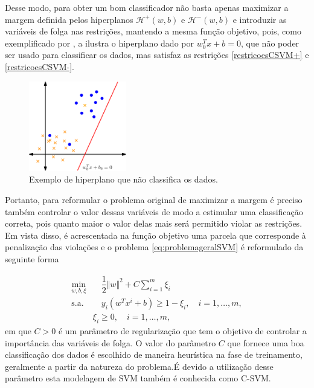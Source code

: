 \documentclass[12pt,a4paper]{scrartcl}
\def\Hset{\mathcal{H}}
\theoremstyle{definition}%
\begin{document}
Desse modo, para obter um bom classificador não basta apenas maximizar a margem definida pelos hiperplanos $\Hset^{+} (w,b)$ e $\Hset^{-} (w,b)$ e introduzir as variáveis de folga nas restrições, mantendo a mesma função objetivo, pois, como exemplificado por \textcite{Evelin2017}, a  ilustra o hiperplano dado por $w_{0}^{T}x+b = 0$, que não poder ser usado para classificar os dados, mas satisfaz as restrições \eqref{restricoesCSVM+} e \eqref{restricoesCSVM-}. 

\begin{figure}[!ht] 
	\centering
	\includegraphics[width=0.38\textwidth]{hiperplano_nao_classifica_dados}
	\caption{Exemplo de hiperplano que não classifica os dados. \label{fig:hiperplano_nao_classificador}}
\end{figure}
 

Portanto, para reformular o problema original de maximizar a margem é preciso também controlar o valor dessas variáveis de modo a estimular uma classificação correta, pois quanto maior o valor delas mais será permitido violar as restrições. Em vista disso, é acrescentada na função objetivo uma parcela que corresponde à penalização das violações e o problema \eqref{eq:problemageralSVM} é reformulado da seguinte forma

\[ \label{eq:problemaCSVM}
\begin{aligned}
\min_{w,b,\xi} & \quad \dfrac{1}{2} \Vert w\Vert^{2} + C \sum_{i=1}^{m} \xi_{i} \\
\text{s.a.} &  \quad y_i(w^{T}x^{i}+b) \geq 1 - \xi_{i}, \quad i=1, \ldots , m, \\
& \xi_{i} \geq 0, \quad i=1, \ldots , m,\end{aligned}
\]
em que $C>0$ é um parâmetro de regularização que tem o objetivo de controlar a importância das variáveis de folga. O valor do parâmetro $C$ que fornece uma boa classificação dos dados é escolhido de maneira heurística na fase de treinamento, geralmente a partir da natureza do problema.É devido a utilização desse parâmetro esta modelagem de SVM também é conhecida como C-SVM.
\end{document}
